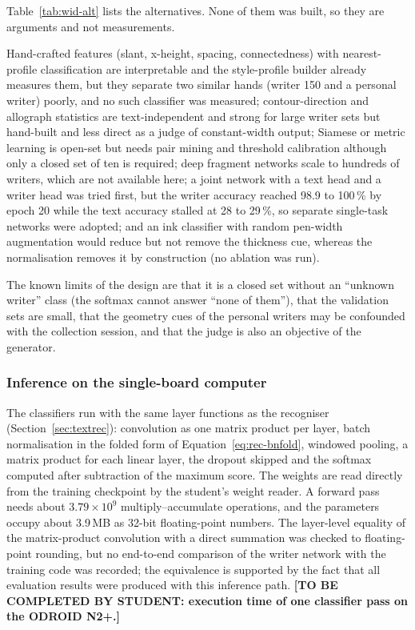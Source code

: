 Table~\ref{tab:wid-alt} lists the alternatives.
None of them was built, so they are arguments and not measurements.

Hand-crafted features (slant, x-height, spacing, connectedness) with nearest-profile classification are interpretable and the style-profile builder already measures them, but they separate two similar hands (writer 150 and a personal writer) poorly, and no such classifier was measured; contour-direction and allograph statistics \cite{bulacu2007} are text-independent and strong for large writer sets but hand-built and less direct as a judge of constant-width output; Siamese or metric learning is open-set but needs pair mining and threshold calibration although only a closed set of ten is required; deep fragment networks \cite{he2020} scale to hundreds of writers, which are not available here; a joint network with a text head and a writer head was tried first, but the writer accuracy reached 98.9 to 100\,\% by epoch 20 while the text accuracy stalled at 28 to 29\,\%, so separate single-task networks were adopted; and an ink classifier with random pen-width augmentation would reduce but not remove the thickness cue, whereas the normalisation removes it by construction (no ablation was run).

The known limits of the design are that it is a closed set without an ``unknown writer'' class (the softmax cannot answer ``none of them''), that the validation sets are small, that the geometry cues of the personal writers may be confounded with the collection session, and that the judge is also an objective of the generator.

\subsubsection{Inference on the single-board computer}

The classifiers run with the same layer functions as the recogniser (Section~\ref{sec:textrec}): convolution as one matrix product per layer, batch normalisation in the folded form of Equation~\ref{eq:rec-bnfold}, windowed pooling, a matrix product for each linear layer, the dropout skipped and the softmax computed after subtraction of the maximum score.
The weights are read directly from the training checkpoint by the student's weight reader.
A forward pass needs about $3.79\times10^9$ multiply--accumulate operations, and the parameters occupy about 3.9\,MB as 32-bit floating-point numbers.
The layer-level equality of the matrix-product convolution with a direct summation was checked to floating-point rounding, but no end-to-end comparison of the writer network with the training code was recorded; the equivalence is supported by the fact that all evaluation results were produced with this inference path.
\textbf{[TO BE COMPLETED BY STUDENT: execution time of one classifier pass on the ODROID N2+.]}
